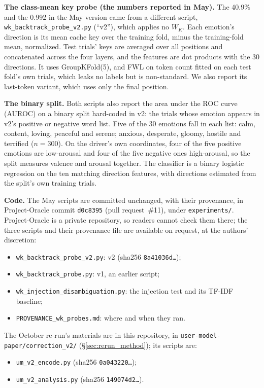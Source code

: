 \documentclass[11pt,a4paper]{article}
\begin{document}
\textbf{The class-mean key probe (the numbers reported in May).} The 40.9\% and the 0.992 in the May version came from a different script, \texttt{wk\_backtrack\_probe\_v2.py} (``v2''), which applies no $W_K$. Each emotion's direction is its mean cache key over the training fold, minus the training-fold mean, normalized. Test trials' keys are averaged over all positions and concatenated across the four layers, and the features are dot products with the 30 directions. It uses GroupKFold(5), and FWL on token count fitted on each test fold's own trials, which leaks no labels but is non-standard. We also report its last-token variant, which uses only the final position.

\textbf{The binary split.} Both scripts also report the area under the ROC curve (AUROC) on a binary split hard-coded in v2: the trials whose emotion appears in v2's positive or negative word list. Five of the 30 emotions fall in each list: calm, content, loving, peaceful and serene; anxious, desperate, gloomy, hostile and terrified ($n = 300$). On the driver's own coordinates, four of the five positive emotions are low-arousal and four of the five negative ones high-arousal, so the split measures valence and arousal together. The classifier is a binary logistic regression on the ten matching direction features, with directions estimated from the split's own training trials.

\textbf{Code.} The May scripts are committed unchanged, with their provenance, in Project-Oracle commit \texttt{d0c8395} (pull request~\#11), under \texttt{experiments/}. Project-Oracle is a private repository, so readers cannot check them there; the three scripts and their provenance file are available on request, at the authors' discretion:
\begin{itemize}[nosep]
    \item \texttt{wk\_backtrack\_probe\_v2.py}: v2 (sha256 \texttt{8a41036d\ldots});
    \item \texttt{wk\_backtrack\_probe.py}: v1, an earlier script;
    \item \texttt{wk\_injection\_disambiguation.py}: the injection test and its TF-IDF baseline;
    \item \texttt{PROVENANCE\_wk\_probes.md}: where and when they ran.
\end{itemize}
The October re-run's materials are in this repository, in \texttt{user-model-paper/correction\_v2/} (\S\ref{sec:rerun_method}); its scripts are:
\begin{itemize}[nosep]
    \item \texttt{um\_v2\_encode.py} (sha256 \texttt{0a043220\ldots});
    \item \texttt{um\_v2\_analysis.py} (sha256 \texttt{149074d2\ldots}).
\end{itemize}
\end{document}
